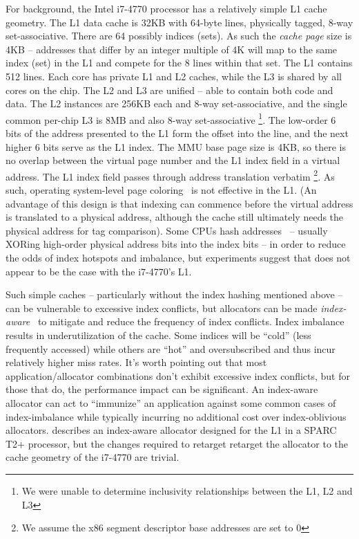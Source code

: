 \documentclass[preprint]{sigplanconf}
\begin{document}
For background, the Intel i7-4770 processor has a relatively simple L1 cache geometry. 
The L1 data cache is 32KB with 64-byte lines, physically tagged, 
8-way set-associative. There are 64 possibly indices (sets). As such the 
\emph{cache page} size is 4KB -- addresses that differ by an integer multiple 
of 4K will map to the same index (set) in the L1 and compete for the 8 lines within that set.  
The L1 contains 512 lines.  
Each core has private L1 and L2 caches, while the L3 is shared by all cores
on the chip.  The L2 and L3 are unified -- able to contain both code and data. 
The L2 instances are 256KB each and 8-way set-associative, and the single common 
per-chip L3 is 8MB and also 8-way set-associative \footnote{We were unable to determine 
inclusivity relationships between the L1, L2 and L3}.  
The low-order 6 bits of the 
address presented to the L1 form the offset into the line, and the next higher 
6 bits serve as the L1 index. The MMU base page size is 4KB, so there is no 
overlap between the virtual page number and the L1 index field in a virtual address. 
The L1 index field passes through address translation verbatim \footnote{
We assume the x86 segment descriptor base addresses are set to 0}. As such, 
operating system-level page coloring~\cite{Romer94} is not effective in the L1. 
(An advantage of this design is that indexing can commence before the virtual 
address is translated to a physical address, although the cache still ultimately needs the physical 
address for tag comparison). Some CPUs hash addresses~\cite{Hund} -- usually XORing 
high-order physical address bits into the index bits -- in order to reduce the 
odds of index hotspots and imbalance, but experiments suggest that does 
not appear to be the case with the i7-4770's L1.  

Such simple caches -- particularly without the index hashing mentioned above -- can be 
vulnerable to excessive index conflicts, but \malloc{} allocators can be 
made \emph{index-aware}~\cite{ISMM11-Afek-CIA} to mitigate and reduce the 
frequency of index conflicts. Index imbalance results in underutilization of 
the cache. Some indices will be ``cold'' (less frequently accessed) while others 
are ``hot'' and oversubscribed and thus incur relatively higher miss rates. It's worth pointing out 
that most application/allocator combinations don't exhibit excessive index 
conflicts, but for those that do, the performance impact can be significant. 
An index-aware allocator can act to ``immunize'' an application against some 
common cases of index-imbalance while typically incurring no additional cost 
over index-oblivious allocators. 
\citet{ISMM11-Afek-CIA} describes an index-aware allocator designed for the 
L1 in a SPARC T2+ processor, but the changes required to retarget 
retarget the allocator to the cache geometry of the i7-4770 are trivial.
\end{document}
